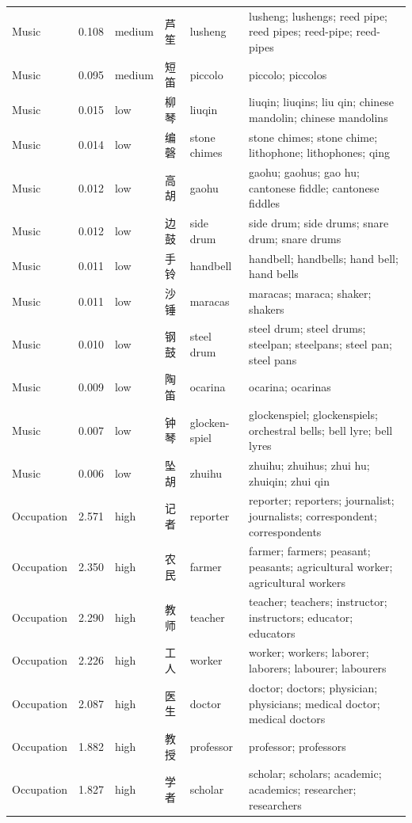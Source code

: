 {\begin{longtable}[c]{@{}>{\raggedright\arraybackslash}p{1.85cm}l l l>{\raggedright\arraybackslash}p{1.85cm}>{\raggedright\arraybackslash}p{8.10cm}@{}}
Music & 0.108 & medium & 芦笙 & lusheng & lusheng; lushengs; reed pipe; reed pipes; reed-pipe; reed-pipes \\
Music & 0.095 & medium & 短笛 & piccolo & piccolo; piccolos \\
Music & 0.015 & low & 柳琴 & liuqin & liuqin; liuqins; liu qin; chinese mandolin; chinese mandolins \\
Music & 0.014 & low & 编磬 & stone chimes & stone chimes; stone chime; lithophone; lithophones; qing \\
Music & 0.012 & low & 高胡 & gaohu & gaohu; gaohus; gao hu; cantonese fiddle; cantonese fiddles \\
Music & 0.012 & low & 边鼓 & side drum & side drum; side drums; snare drum; snare drums \\
Music & 0.011 & low & 手铃 & handbell & handbell; handbells; hand bell; hand bells \\
Music & 0.011 & low & 沙锤 & maracas & maracas; maraca; shaker; shakers \\
Music & 0.010 & low & 钢鼓 & steel drum & steel drum; steel drums; steelpan; steelpans; steel pan; steel pans \\
Music & 0.009 & low & 陶笛 & ocarina & ocarina; ocarinas \\
Music & 0.007 & low & 钟琴 & glocken-\newline spiel & glockenspiel; glockenspiels; orchestral bells; bell lyre; bell lyres \\
Music & 0.006 & low & 坠胡 & zhuihu & zhuihu; zhuihus; zhui hu; zhuiqin; zhui qin \\
Occupation & 2.571 & high & 记者 & reporter & reporter; reporters; journalist; journalists; correspondent; correspondents \\
Occupation & 2.350 & high & 农民 & farmer & farmer; farmers; peasant; peasants; agricultural worker; agricultural workers \\
Occupation & 2.290 & high & 教师 & teacher & teacher; teachers; instructor; instructors; educator; educators \\
Occupation & 2.226 & high & 工人 & worker & worker; workers; laborer; laborers; labourer; labourers \\
Occupation & 2.087 & high & 医生 & doctor & doctor; doctors; physician; physicians; medical doctor; medical doctors \\
Occupation & 1.882 & high & 教授 & professor & professor; professors \\
Occupation & 1.827 & high & 学者 & scholar & scholar; scholars; academic; academics; researcher; researchers \\

\end{longtable}}
